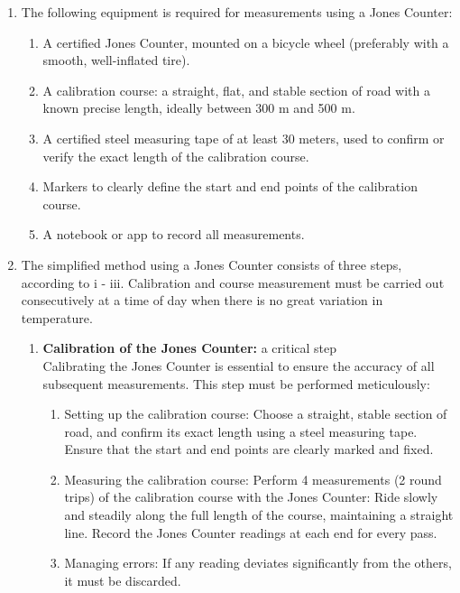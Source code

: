\begin{enumerate}[leftmargin=1.5em,labelsep=*]
	\item The following equipment is required for measurements using a Jones Counter:
	\begin{enumerate}[label=\roman*,leftmargin=1.75em,labelsep=*]
		\item A certified Jones Counter, mounted on a bicycle wheel (preferably with a smooth, well-inflated tire).
		\item A calibration course: a straight, flat, and stable section of road with a known precise length, ideally between 300 m and 500 m.
		\item A certified steel measuring tape of at least 30 meters, used to confirm or verify the exact length of the calibration course.
		\item Markers to clearly define the start and end points of the calibration course.
		\item A notebook or app to record all measurements.
	\end{enumerate}
	\item The simplified method using a Jones Counter consists of three steps, according to i - iii.
	Calibration and course measurement must be carried out consecutively at a time of day when there is no great variation in temperature.
	\begin{enumerate}[label=\roman*,leftmargin=1.75em,labelsep=*]
		\item \textbf{Calibration of the Jones Counter:} a critical step\\
		Calibrating the Jones Counter is essential to ensure the accuracy of all subsequent measurements.
		This step must be performed meticulously:
		\begin{enumerate}[label*=.\roman*,leftmargin=3.25em,labelsep=*]
			\item Setting up the calibration course:
			Choose a straight, stable section of road, and confirm its exact length using a steel measuring tape.
			Ensure that the start and end points are clearly marked and fixed.
			\item Measuring the calibration course:
			Perform 4 measurements (2 round trips) of the calibration course with the Jones Counter:
			Ride slowly and steadily along the full length of the course, maintaining a straight line.
			Record the Jones Counter readings at each end for every pass.
			\item Managing errors:
			If any reading deviates significantly from the others, it must be discarded.

\end{enumerate}
\end{enumerate}
\end{enumerate}
